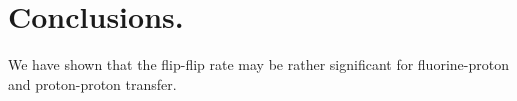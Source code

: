 \documentclass[a4paper, 12pt]{article}
\begin{document}
\section{Conclusions.}
We have shown that the flip-flip rate may be rather significant for fluorine-proton and proton-proton transfer.

  






%
%
%
\end{document}
